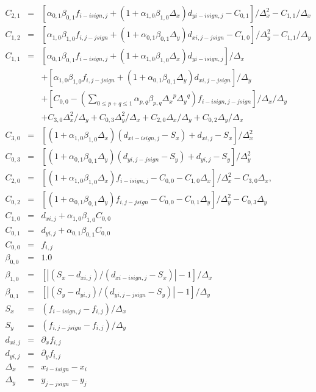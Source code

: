 \begin{eqnarray}
C_{2,1}&=&[\alpha_{0,1}\beta_{0,1}f_{i-isign,j}+(1+\alpha_{1,0}\beta_{1,0}\Delta_x)d_{yi-isign,j}-C_{0,1}]/\Delta_x^2 -C_{1,1}/\Delta_x \\
           C_{1,2}&=&[\alpha_{1,0}\beta_{1,0}f_{i,j-jsign}+(1+\alpha_{0,1}\beta_{0,1}\Delta_y)d_{xi,j-jsign}-C_{1,0}]/\Delta_y^2  -C_{1,1}/\Delta_y \\
           C_{1,1}&=&[\alpha_{0,1}\beta_{0,1}f_{i-isign,j}+(1+\alpha_{1,0}\beta_{1,0}\Delta_x)d_{yi-isign,j}]/\Delta_x  \nonumber \\
                  & &+[\alpha_{1,0}\beta_{1,0}f_{i,j-jsign}+(1+\alpha_{0,1}\beta_{0,1}\Delta_y)d_{xi,j-jsign}]/\Delta_y  \nonumber \\
                  & &+[C_{0,0}-({\sum_{\scriptstyle 0\le p+q\le 1}} \alpha_{p,q}\beta_{p,q}{\Delta_x}^p{\Delta_y}^q)f_{i-isign,j-jsign}]/\Delta_x/\Delta_y  \nonumber \\
                  & &+C_{3,0}\Delta_x^2/\Delta_y+C_{0,3}\Delta_y^2/\Delta_x+C_{2,0}\Delta_x/\Delta_y+C_{0,2}\Delta_y/\Delta_x \\
           C_{3,0}&=&[(1+\alpha_{1,0}\beta_{1,0}\Delta_x)(d_{xi-isign,j}-S_x)+d_{xi,j}-S_x ]/\Delta_x^2\\
           C_{0,3}&=&[(1+\alpha_{0,1}\beta_{0,1}\Delta_y)(d_{yi,j-jsign}-S_y)+d_{yi,j}-S_y ]/\Delta_y^2\\
           C_{2,0}&=&[(1+\alpha_{1,0}\beta_{1,0}\Delta_x)f_{i-isign,j}-C_{0,0}-C_{1,0}\Delta_x]/\Delta_x^2-C_{3,0}\Delta_x,\\
           C_{0,2}&=&[(1+\alpha_{0,1}\beta_{0,1}\Delta_y)f_{i,j-jsign}-C_{0,0}-C_{0,1}\Delta_y]/\Delta_y^2-C_{0,3}\Delta_y\\
           C_{1,0}&=&d_{xi,j} +\alpha_{1,0}\beta_{1,0}C_{0,0} \\
           C_{0,1}&=&d_{yi,j} +\alpha_{0,1}\beta_{0,1}C_{0,0} \\
           C_{0,0}&=&f_{i,j}\\
\beta _{0,0}&=&1.0\\
\beta _{1,0}&=&[|(S_x-d_{xi,j})/(d_{xi-isign,j}-S_x)|-1]/\Delta_x\\
\beta _{0,1}&=&[|(S_y-d_{yi,j})/(d_{yi,j-jsign}-S_y)|-1]/\Delta_y\\
           S_x &=& (f_{i-isign,j}-f_{i,j})/\Delta_x\\
           S_y &=& (f_{i,j-jsign}-f_{i,j})/\Delta_y\\
       d_{xi,j} &=& \partial_x f_{i,j}\\
       d_{yi,j} &=& \partial_y f_{i,j}\\
\Delta _x &=& x_{i-isign}-x_{i}\\
\Delta _y &=& y_{j-jsign}-y_{j}
\end{eqnarray}
